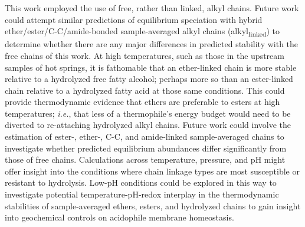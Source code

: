 This work employed the use of free, rather than linked, alkyl chains. Future work could attempt similar predictions of equilibrium speciation with hybrid ether/ester/C-C/amide-bonded sample-averaged alkyl chains (alkyl\textsubscript{linked}) to determine whether there are any major differences in predicted stability with the free chains of this work. At high temperatures, such as those in the upstream samples of hot springs, it is fathomable that an ether-linked chain is more stable relative to a hydrolyzed free fatty alcohol; perhaps more so than an ester-linked chain relative to a hydrolyzed fatty acid at those same conditions. This could provide thermodynamic evidence that ethers are preferable to esters at high temperatures; \textit{i.e.}, that less of a thermophile's energy budget would need to be diverted to re-attaching hydrolyzed alkyl chains. Future work could involve the estimation of ester-, ether-, C-C, and amide-linked sample-averaged chains to investigate whether predicted equilibrium abundances differ significantly from those of free chains. Calculations across temperature, pressure, and pH might offer insight into the conditions where chain linkage types are most susceptible or resistant to hydrolysis. Low-pH conditions could be explored in this way to investigate potential temperature-pH-redox interplay in the thermodynamic stabilities of sample-averaged ethers, esters, and hydrolyzed chains to gain insight into geochemical controls on acidophile membrane homeostasis.


